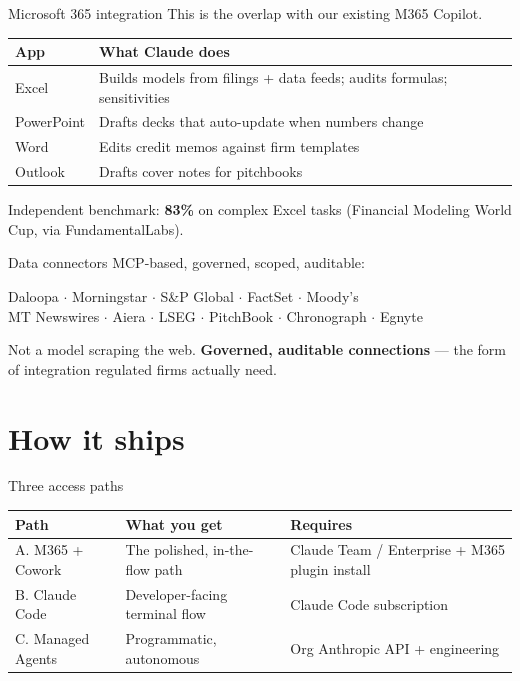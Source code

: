 \documentclass[11pt,aspectratio=169]{beamer}
\newcommand{\hl}[1]{\textbf{\textcolor{accentpurple}{#1}}}
\begin{document}
\begin{frame}{Microsoft 365 integration}
  This is the overlap with our existing M365 Copilot.

  \medskip
  \centering\small
  \begin{tabular}{lp{}}
    \toprule
    \textbf{App} & \textbf{What Claude does} \\
    \midrule
    Excel       & Builds models from filings + data feeds; audits formulas; sensitivities \\
    PowerPoint  & Drafts decks that auto-update when numbers change \\
    Word        & Edits credit memos against firm templates \\
    Outlook     & Drafts cover notes for pitchbooks \\
    \bottomrule
  \end{tabular}

  \vfill
  \raggedright Independent benchmark: \hl{83\%} on complex Excel tasks (Financial Modeling World Cup, via FundamentalLabs).
\end{frame}

\begin{frame}{Data connectors}
  MCP-based, governed, scoped, auditable:

  \vfill
  \centering
  Daloopa $\cdot$ Morningstar $\cdot$ S\&P Global $\cdot$ FactSet $\cdot$ Moody's
  \medskip\\
  MT Newswires $\cdot$ Aiera $\cdot$ LSEG $\cdot$ PitchBook $\cdot$ Chronograph $\cdot$ Egnyte

  \vfill
  \raggedright
  Not a model scraping the web. \hl{Governed, auditable connections} --- the form of integration regulated firms actually need.
\end{frame}

\section{How it ships}

\begin{frame}{Three access paths}
  \centering\small
  \begin{tabular}{lp{}p{}}
    \toprule
    \textbf{Path} & \textbf{What you get} & \textbf{Requires} \\
    \midrule
    A. M365 + Cowork     & The polished, in-the-flow path & Claude Team / Enterprise + M365 plugin install \\
    B. Claude Code       & Developer-facing terminal flow & Claude Code subscription \\
    C. Managed Agents    & Programmatic, autonomous & Org Anthropic API + engineering \\
    \bottomrule
  \end{tabular}
\end{frame}
\end{document}
